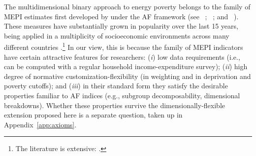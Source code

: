 \documentclass[11pt, a4paper]{article}
\newcommand{\citealp}[1]{\citeauthor{#1}~\citeyear{#1}}
\begin{document}
The multidimensional binary approach to energy poverty belongs to the family of MEPI estimates first developed by \textcite{nussbaumer2012} under the AF framework (see \citealp{alkire2010}; \citealp{alkire2011}; and \citealp{alkire2015}). These measures have substantially grown in popularity over the last 15 years, being applied in a multiplicity of socioeconomic environments across many different countries \parencite{pelz2018, sy2022a}.\footnote{The literature is extensive: \textcite{ogwumike2016, nussbaumer2013, bollino2017, okushima2017, sadath2017, bersisa2017, mendoza2019, crentsil2019, abbas2020, qurat-ul-ann2021, santillan2020, sokolowski2020, jayasinghe2021, ssennono2021, wang2022, kryk2023, rizal2024, tovarreanos2025a, canto-franco2026, jimeneztorres2026, cedano2021, robles-bonilla2021}.} In our view, this is because the family of MEPI indicators have certain attractive features for researchers: (\textit{i}) low data requirements (i.e., can be computed with a regular household income-expenditure survey); (\textit{ii}) high degree of normative customization-flexibility (in weighting and in deprivation and poverty cutoffs); and (\textit{iii}) in their standard form they satisfy the desirable properties familiar to AF indices (e.g., subgroup decomposability, dimensional breakdowns). Whether these properties survive the dimensionally-flexible extension proposed here is a separate question, taken up in Appendix~\ref{app:axioms}.
\end{document}
